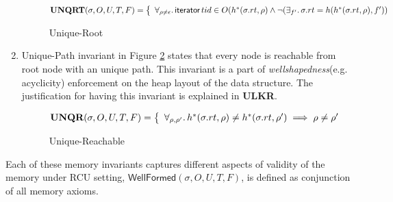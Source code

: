 \begin{enumerate}
  \begin{figure}[!htb]
\[
\textbf{UNQRT}(\sigma,O,U,T,F) =
  \left\{ \begin{array}{ll}
 \forall_{\rho \neq \epsilon} \ldotp \textsf{iterator} \, tid \in O( h^{*}(\sigma.rt,\rho) \land \lnot(\exists_{f'} \ldotp \sigma.rt = h( h^{*}(\sigma.rt,\rho),f'))
\end{array} \right.%
\]
    \caption{Unique-Root}
\label{fig:uroot}
\end{figure}
\item{Unique-Path} invariant in Figure \ref{fig:upath} states that every node is reachable from root node with an unique path. This invariant is a part of \emph{wellshapedness}(e.g. acyclicity) enforcement on the heap layout of the data structure. The justification for having this invariant is explained in \textbf{ULKR}.
  \begin{figure}[!htb]
\[
\textbf{UNQR}(\sigma,O,U,T,F) =
\left\{
\begin{array}{ll}
    \forall_{\rho, \rho'}  \ldotp  h^{*}(\sigma.rt,\rho) \neq h^{*}(\sigma.rt, \rho') \implies  \rho \neq \rho' 
\end{array}
\right.%
\]
\caption{Unique-Reachable}
\label{fig:upath}
\end{figure}
\end{enumerate}
 Each of these memory invariants captures different aspects of validity of the memory under \textsf{RCU} setting, $\textsf{WellFormed}(\sigma,O,U,T,F) $, is defined as conjunction of all memory axioms.

